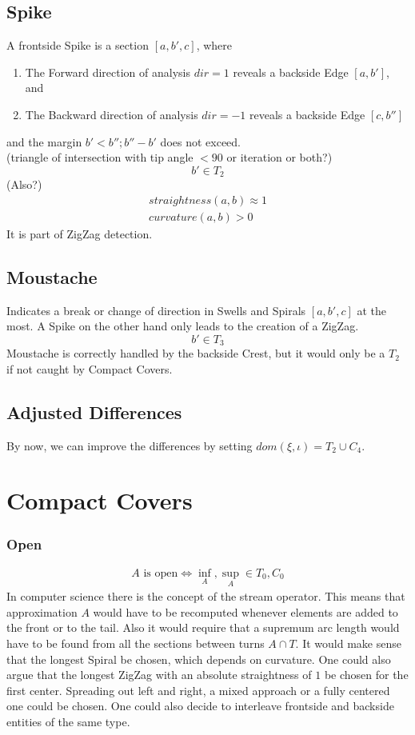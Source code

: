 \documentclass{report}
\begin{document}
\subsection{Spike}
A frontside Spike is a section $[a,b',c]$, where
\begin{enumerate}
\item The Forward direction of analysis $dir=1$ reveals a backside Edge $[a,b']$, and
\item The Backward direction of analysis $dir=-1$ reveals a backside Edge $[c,b'']$ 
\end{enumerate}
and the margin $b'<b'';b''-b'$ does not exceed.\\
(triangle of intersection with tip angle $<90$ or iteration or both?)\\
\begin{equation}
b' \in T_{2}
\end{equation}
(Also?)
\begin{align}
straightness(a,b)\approx 1\\ curvature(a,b)>0
\end{align}
It is part of ZigZag detection.

\subsection{Moustache}
Indicates a break or change of direction in Swells and Spirals $[a,b',c]$ at the most. A Spike on the other hand only leads to the creation of a ZigZag.
\begin{equation}
b' \in T_{3}
\end{equation}
Moustache is correctly handled by the backside Crest, but it would only be a $T_{2}$ if not caught by Compact Covers.

\subsection*{Adjusted Differences}
By now, we can improve the differences by setting $dom(\xi,\iota)=T_{2}\cup C_{4}$.

\section{Compact Covers}
\subsubsection*{Open}
\begin{align}
A \text{ is open} \Leftrightarrow \inf_{A},\sup_{A}\in T_{0},C_{0}
\end{align}
In computer science there is the concept of the stream operator. This means that approximation $A$ would have to be recomputed whenever elements are added to the front or to the tail. Also it would require that a supremum arc length would have to be found from all the sections between turns $A \cap T$. It would make sense that the longest Spiral be chosen, which depends on curvature. One could also argue that the longest ZigZag with an absolute straightness of $1$ be chosen for the first center. Spreading out left and right, a mixed approach or a fully centered one could be chosen. One could also decide to interleave frontside and backside entities of the same type.
\end{document}
